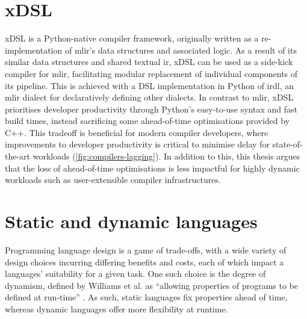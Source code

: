 \section{xDSL}
\label{sec:xdsl}

xDSL is a Python-native compiler framework, originally written as a re-implementation of \ac{mlir}'s data structures and associated logic.
As a result of its similar data structures and shared textual \ac{ir}, xDSL can be used as a side-kick compiler for \ac{mlir}, facilitating modular replacement of individual components of its pipeline. This is achieved with a DSL implementation in Python of \ac{irdl}, an \ac{mlir} dialect for declaratively defining other dialects.
In contrast to \ac{mlir}, xDSL prioritises developer productivity through Python's easy-to-use syntax and fast build times, instead sacrificing some ahead-of-time optimisations provided by C++.
This tradeoff is beneficial for modern compiler developers, where improvements to developer productivity is critical to minimise delay for state-of-the-art workloads (\autoref{fig:compilers-lagging}). In addition to this, this thesis argues that the loss of ahead-of-time optimisations is less impactful for highly dynamic workloads such as user-extensible compiler infrastructures.



\section{Static and dynamic languages}
\label{sec:static-dynamic-languages}


Programming language design is a game of trade-offs, with a wide variety of design choices incurring differing benefits and costs, each of which impact a languages' suitability for a given task.
One such choice is the degree of dynamism, defined by Williams et al. as ``allowing properties of programs to be defined at run-time'' \cite{williamsDynamicInterpretationDynamic2010}. As such, static languages fix properties ahead of time, whereas dynamic languages offer more flexibility at runtime.

